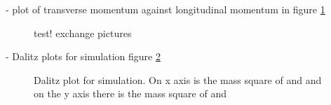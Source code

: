- plot of transverse momentum against longitudinal momentum in figure \ref{fig:MC_lambda0_pt_vs_pz}%

\begin{figure}
	\caption{test! exchange pictures}
	\label{fig:MC_lambda0_pt_vs_pz}
\end{figure}

- Dalitz plots for simulation figure \ref{fig:eventgeneration_dalitz}

\begin{figure}
	\caption{Dalitz plot for simulation. On x axis is the mass square of \lam  and \kminus and on the y axis there is the mass square of \anticascade and \kminus}
	\label{fig:eventgeneration_dalitz}
\end{figure}

